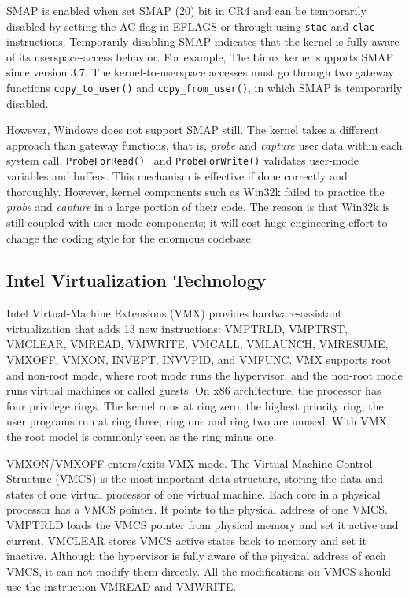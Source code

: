 SMAP is enabled when set SMAP (20) bit in CR4 and can be temporarily disabled by setting the AC flag in EFLAGS or through using \texttt{stac} and \texttt{clac} instructions. Temporarily disabling SMAP indicates that the kernel is fully aware of its userspace-access behavior. For example, The Linux kernel supports SMAP since version 3.7. The kernel-to-userspace accesses must go through two gateway functions \texttt{copy\_to\_user()} and \texttt{copy\_from\_user()}, in which SMAP is temporarily disabled.

However, Windows does not support SMAP still. The kernel takes a different approach than gateway functions, that is, \textit{probe} and \textit{capture} user data within each system call. \texttt{ProbeForRead()}~\cite{probeforread} and \texttt{ProbeForWrite()} validates user-mode variables and buffers. This mechanism is effective if done correctly and thoroughly. However, kernel components such as Win32k failed to practice the \textit{probe} and \textit{capture} in a large portion of their code.  The reason is that Win32k is still coupled with user-mode components; it will cost huge engineering effort to change the coding style for the enormous codebase.


\subsection{Intel Virtualization Technology}

Intel Virtual-Machine Extensions (VMX) provides hardware-assistant virtualization that adds 13 new instructions: VMPTRLD, VMPTRST, VMCLEAR, VMREAD, VMWRITE, VMCALL, VMLAUNCH, VMRESUME, VMXOFF, VMXON, INVEPT, INVVPID, and VMFUNC. VMX supports root and non-root mode, where root mode runs the hypervisor, and the non-root mode runs virtual machines or called guests. On x86 architecture, the processor has four privilege rings. The kernel runs at ring zero, the highest priority ring; the user programs run at ring three; ring one and ring two are unused. With VMX, the root model is commonly seen as the ring minus one.

VMXON/VMXOFF enters/exits VMX mode. The Virtual Machine Control Structure (VMCS) is the most important data structure, storing the data and states of one virtual processor of one virtual machine. Each core in a physical processor has a VMCS pointer. It points to the physical address of one VMCS. VMPTRLD loads the VMCS pointer from physical memory and set it active and current. VMCLEAR stores VMCS active states back to memory and set it inactive. Although the hypervisor is fully aware of the physical address of each VMCS, it can not modify them directly. All the modifications on VMCS should use the instruction VMREAD and VMWRITE. 

